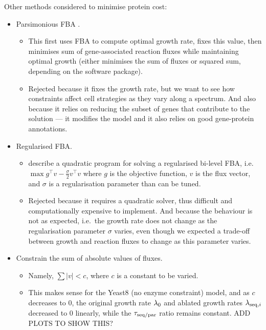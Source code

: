 Other methods considered to minimise protein cost:
\begin{itemize}
  \item Parsimonious FBA \parencite{lewisOmicDataEvolved2010}.
    \begin{itemize}
      \item This first uses FBA to compute optimal growth rate, fixes this value, then minimises sum of gene-associated reaction fluxes while maintaining optimal growth (either minimises the sum of fluxes or squared sum, depending on the software package).
      \item Rejected because it fixes the growth rate, but we want to see how constraints affect cell strategies as they vary along a spectrum.
        And also because it relies on reducing the subset of genes that contribute to the solution --- it modifies the model and it also relies on good gene-protein annotations.
    \end{itemize}
  \item Regularised FBA.
    \begin{itemize}
      \item \textcite{vijayakumarHybridFluxBalance2020} describe a quadratic program for solving a regularised bi-level FBA, i.e.\: $\max g^\intercal v - \frac{\sigma}{2}v^\intercal v$ where $g$ is the objective function, $v$ is the flux vector, and $\sigma$ is a regularisation parameter than can be tuned.
      \item Rejected because it requires a quadratic solver, thus difficult and computationally expensive to implement.
            And because the behaviour is not as expected, i.e.\ the growth rate does not change as the regularisation parameter $\sigma$ varies, even though we expected a trade-off between growth and reaction fluxes to change as this parameter varies.
    \end{itemize}
  \item Constrain the sum of absolute values of fluxes.
    \begin{itemize}
      \item Namely, $\sum |v| < c$, where $c$ is a constant to be varied.
      \item This makes sense for the Yeast8 (no enzyme constraint) model, and as $c$ decreases to 0, the original growth rate $\lambda_{0}$ and ablated growth rates $\lambda_{\mathrm{seq},i}$ decreased to 0 linearly, while the $\tau_{\mathrm{seq}/\mathrm{par}}$ ratio remains constant.
            ADD PLOTS TO SHOW THIS?
    \end{itemize}
\end{itemize}

